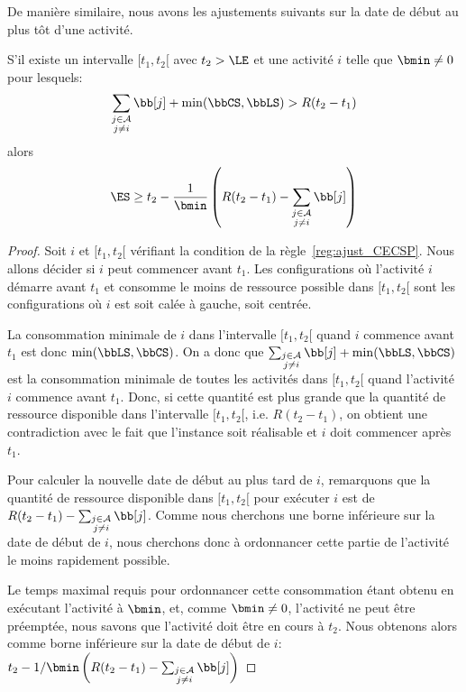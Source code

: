 De manière similaire, nous avons les ajustements suivants sur la date
de début au plus tôt d'une activité. 
\begin{reg}
\label{reg:ajustRi_CECSP}
S'il existe un intervalle $[t_1,t_2[$ avec $ t_2 > \LE$ et une
activité $i$ telle que $\bmin \neq 0$ pour lesquels:
  \[ \sum_{\substack{j \in \A \\ j \neq i}} \bb[j] +
    \min(\bbCS,\bbLS) > R (t_2-t_1)\] 
  alors
  \[ \ES \ge t_2 - \frac{1}{\bmin} \left(R (t_2-t_1) -\sum_{\substack{j
\in \A \\ j \neq i}} \bb[j] \right) \]
\end{reg}

\begin{proof}
Soit $i$ et $[t_1,t_2[$ vérifiant la condition de la
règle~\ref{reg:ajust_CECSP}. Nous allons décider si $i$ peut commencer
avant $t_1$. Les configurations où l'activité $i$ démarre avant $t_1$
et consomme le moins de ressource possible dans $[t_1,t_2[$ sont les
configurations où $i$ est soit calée à gauche, soit centrée.

La consommation minimale de $i$ dans l'intervalle $[t_1,t_2[$ quand
$i$ commence avant $t_1$ est donc $\min( \bbLS, \bbCS)$. On a donc que
$\sum_{\substack{j \in \A\\ j\neq i}} \bb[j] + \min( \bbLS, \bbCS) $
est la consommation minimale de toutes les activités dans $[t_1,t_2[$
quand l'activité $i$ commence avant $t_1$. Donc, si cette quantité est
plus grande que la quantité de ressource disponible dans l'intervalle
$[t_1,t_2[$, i.e. $R(t_2-t_1)$, on obtient une contradiction avec le
fait que l'instance soit réalisable et $i$ doit commencer après $t_1$.

Pour calculer la nouvelle date de début au plus tard de $i$,
remarquons que la quantité de ressource disponible dans $[t_1,t_2[$
pour exécuter $i$ est de $R(t_2-t_1) -\sum_{\substack{j \in \A\\
j\neq i}} \bb[j]$. Comme nous cherchons une borne inférieure sur la date de
début de $i$, nous cherchons donc à ordonnancer cette partie de
l'activité le moins rapidement possible. 

Le temps maximal requis pour ordonnancer cette consommation étant
obtenu en exécutant l'activité à $\bmin$, et, comme $\bmin \neq 0$,
l'activité ne peut être préemptée, nous savons que l'activité doit
être en cours à $t_2$. Nous obtenons alors comme borne inférieure sur
la date de début de $i$:
$t_2 - 1/\bmin \left(R (t_2-t_1) -\sum_{\substack{j
\in \A \\ j \neq i}} \bb[j] \right) $
\end{proof}

